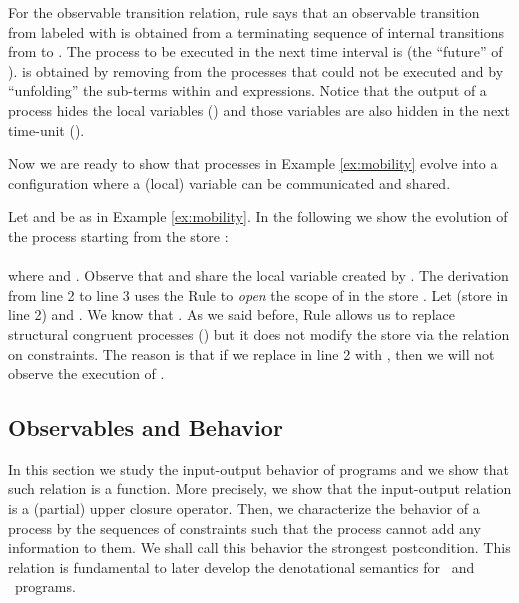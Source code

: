 \documentclass{tlp}
\begin{document}
For the observable transition relation, rule  says that an observable transition from  labeled
with   is obtained from a terminating sequence of internal transitions from  to  . The process  to be executed in the next time interval is    (the ``future'' of ).   is obtained by removing from  the  processes that could not be executed  and  by 
``unfolding'' the sub-terms within  and  expressions. Notice that 
the output of a process hides the local variables () and those variables are also hidden in the next time-unit (). 


Now we are ready to show 
 that processes in Example \ref{ex:mobility} evolve into a configuration where a (local) variable can be communicated and shared. 



\begin{example}\label{ex:ex-mob-sos}
Let  and  be as in Example \ref{ex:mobility}. 
In the following we show the evolution of the process   starting from the store  :\\

\resizebox{\textwidth}{!}{

}\\


where 
and .  Observe that  and  share the local variable  created by . The derivation from line 2 to line 3   uses the Rule  to \emph{open} the scope of  in the store . 
Let   (store in line 2) and . We know that . 
 As we said before,  Rule   allows us to replace structural congruent processes () but it does not  modify the store via the   relation   on constraints. The reason is that if we replace  in line 2 with  , then we will not observe the execution of . 
\end{example}

\subsection{Observables and  Behavior} \label{sec:observables}
In this section we study the input-output behavior of programs and we show that such relation is a function. More precisely, we show that the input-output relation is a (partial) upper closure operator. Then, we characterize the behavior of a process by the sequences of constraints such that the process cannot add any information to them. We shall call this behavior the strongest postcondition. This relation is fundamental to later develop the denotational semantics for \tccp\ and \utcc\ programs. 
\end{document}
